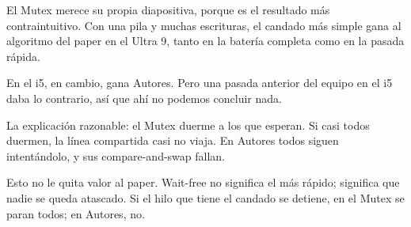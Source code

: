 El Mutex merece su propia diapositiva, porque es el resultado más contraintuitivo. Con una pila y muchas escrituras, el candado más simple gana al algoritmo del paper en el Ultra 9, tanto en la batería completa como en la pasada rápida.

En el i5, en cambio, gana Autores. Pero una pasada anterior del equipo en el i5 daba lo contrario, así que ahí no podemos concluir nada.

La explicación razonable: el Mutex duerme a los que esperan. Si casi todos duermen, la línea compartida casi no viaja. En Autores todos siguen intentándolo, y sus compare-and-swap fallan.

Esto no le quita valor al paper. Wait-free no significa el más rápido; significa que nadie se queda atascado. Si el hilo que tiene el candado se detiene, en el Mutex se paran todos; en Autores, no.
